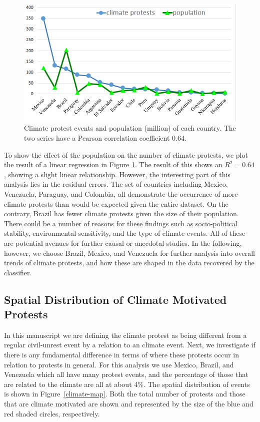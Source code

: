 \documentclass[9pt,twocolumn,twoside]{pnas-new}
\begin{document}
\begin{figure}[ht]
\centerline
{\includegraphics[width=.4\textwidth]{figures/protest-population}}
\caption{Climate protest events and population (million) of each country. The two series have a Pearson correlation coefficient 0.64.}
\label{protest-population}
\end{figure}

To show the effect of the population on the number of climate protests, we plot the result of a linear regression in Figure \ref{protest-population}.
The result of this shows an $R^2 = 0.64$, showing a slight linear relationship.
However, the interesting part of this analysis lies in the residual errors.
The set of countries including Mexico, Venezuela, Paraguay, and Colombia, all demonstrate the occurrence of more climate protests than would be expected given the entire dataset.
On the contrary, Brazil has fewer climate protests given the size of their population.
There could be a number of reasons for these findings such as socio-political stability, environmental sensitivity, and the type of climate events.
All of these are potential avenues for further causal or anecdotal studies.
In the following, however, we choose Brazil, Mexico, and Venezuela for further analysis into overall trends of climate protests, and how these are shaped in the data recovered by the classifier.


\subsection{Spatial Distribution of Climate Motivated Protests}
In this manuscript we are defining the climate protest as being different from a regular civil-unrest event by a relation to an climate event.
Next, we investigate if there is any fundamental difference in terms of where these protests occur in relation to protests in general.
For this analysis we use Mexico, Brazil, and Venezuela which all have many protest events, and the percentage of those that are related to the climate are all at about 4\%.
The spatial distribution of events is shown in  Figure~\ref{climate-map}.
Both the total number of protests and those that are climate motivated are shown and represented by the size of the blue and red shaded circles, respectively.
\end{document}
